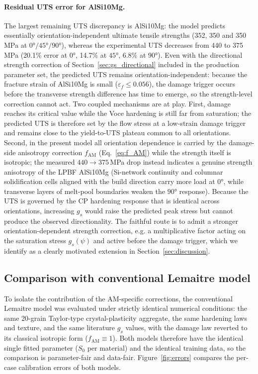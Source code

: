 \documentclass[12pt,a4paper,twocolumn]{article}
\begin{document}
\paragraph{Residual UTS error for AlSi10Mg.}
The largest remaining UTS discrepancy is AlSi10Mg: the model predicts essentially orientation-independent ultimate tensile strengths (352, 350 and 350\,MPa at $\ang{0}/\ang{45}/\ang{90}$), whereas the experimental UTS decreases from 440 to 375\,MPa (20.1\% error at $\ang{0}$, 14.7\% at $\ang{45}$, 6.8\% at $\ang{90}$). Even with the directional strength correction of Section~\ref{sec:gs_directional} included in the production parameter set, the predicted UTS remains orientation-independent: because the fracture strain of AlSi10Mg is small ($\varepsilon_f \le 0.056$), the damage trigger occurs before the transverse strength difference has time to emerge, so the strength-level correction cannot act. Two coupled mechanisms are at play. First, damage reaches its critical value while the Voce hardening is still far from saturation; the predicted UTS is therefore set by the flow stress at a low-strain damage trigger and remains close to the yield-to-UTS plateau common to all orientations. Second, in the present model all orientation dependence is carried by the damage-side anisotropy correction $f_{\mathrm{AM}}$ (Eq.~\eqref{eq:f_AM}) while the strength itself is isotropic; the measured $440\to375$\,MPa drop instead indicates a genuine strength anisotropy of the LPBF AlSi10Mg (Si-network continuity and columnar solidification cells aligned with the build direction carry more load at $\ang{0}$, while transverse layers of melt-pool boundaries weaken the $\ang{90}$ response). Because the UTS is governed by the CP hardening response that is identical across orientations, increasing $g_s$ would raise the predicted peak stress but cannot produce the observed directionality. The faithful route is to admit a stronger orientation-dependent strength correction, e.g. a multiplicative factor acting on the saturation stress $g_s(\psi)$ and active before the damage trigger, which we identify as a clearly motivated extension in Section~\ref{sec:discussion}.

\subsection{Comparison with conventional Lemaitre model}

To isolate the contribution of the AM-specific corrections, the conventional Lemaitre model was evaluated under strictly identical numerical conditions: the same 20-grain Taylor-type crystal-plasticity aggregate, the same hardening laws and texture, and the same literature $g_s$ values, with the damage law reverted to its classical isotropic form ($f_{\mathrm{AM}} \equiv 1$). Both models therefore have the identical single fitted parameter ($S_0$ per material) and the identical training data, so the comparison is parameter-fair and data-fair. Figure~\ref{fig:errors} compares the per-case calibration errors of both models.
\end{document}
